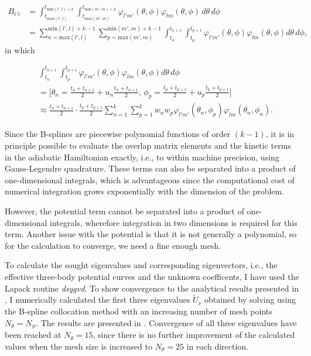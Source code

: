 \begin{equation}
\begin{aligned}
B_{i'i} &= \int_{t_{\text{max}(l',l)}}^{t_{\text{min}(l',l)+k}} \int_{t_{\text{max}(m',m)}}^{t_{\text{min}(m',m)+k}} \varphi_{l'm'}(\theta,\phi)\varphi_{lm}(\theta,\phi)\,d\theta\,d\phi \\
&= \sum_{n={\text{max}(l',l)}}^{\text{min}(l',l)+k-1} \sum_{p={\text{max}(m',m)}}^{\text{min}(m',m)+k-1} \int_{t_{n}}^{t_{n+1}} \int_{t_{p}}^{t_{p+1}} \varphi_{l'm'}(\theta,\phi) \varphi_{lm}(\theta,\phi) d\theta\,d\phi,
\end{aligned}
\end{equation}
in which

\begin{equation}
\begin{aligned}
&\int_{t_{n}}^{t_{n+1}} \int_{t_{p}}^{t_{p+1}} \varphi_{l'm'}(\theta,\phi) \varphi_{lm}(\theta,\phi) d\theta\,d\phi\,\\
&=\bigg[\theta_n = \frac{t_n + t_{n+1}}{2} + u_n\frac{t_n + t_{n+1}}{2}, \, \phi_p = \frac{t_p + t_{p+1}}{2} + u_p\frac{t_p + t_{p+1}}{2}\bigg]\\
&\approx \frac{t_n + t_{n+1}}{2} \cdot \frac{t_p + t_{p+1}}{2} \sum_{n=1}^{k}\sum_{p=1}^{k}w_n w_p \varphi_{l'm'}(\theta_n,\phi_p) \varphi_{lm}(\theta_n,\phi_n).
\end{aligned}
\end{equation}

Since the B-splines are piecewise polynomial functions of order $(k-1)$, it is in principle possible to evaluate the overlap matrix elements and the kinetic terms in the adiabatic Hamiltonian exactly, i.e., to within machine precision, using Gauss-Legendre quadrature. These terms can also be separated into a product of one-dimensional integrals, which is advantageous since the computational cost of numerical integration grows exponentially with the dimension of the problem.

However, the potential term cannot be separated into a product of one-dimensional integrals, wherefore integration in two dimensions is required for this term. Another issue with the potential is that it is not generally a polynomial, so for the calculation to converge, we need a fine enough mesh. 

To calculate the sought eigenvalues and corresponding eigenvectors, i.e., the effective three-body potential curves and the unknown coefficents, I have used the Lapack routine \textit{dsygvd}. To show convergence to the analytical results presented in , I numerically calculated the first three eigenvalues $\tilde{U}_{\nu}$ obtained by solving  using the B-spline collocation method with an increasing number of mesh points $N_{\theta}=N_{\phi}$. The results are presented in . Convergence of all three eigenvalues have been reached at $N_{\theta}=15$, since there is no further improvement of the calculated values when the mesh size is increased to $N_{\theta}=25$ in each direction.

